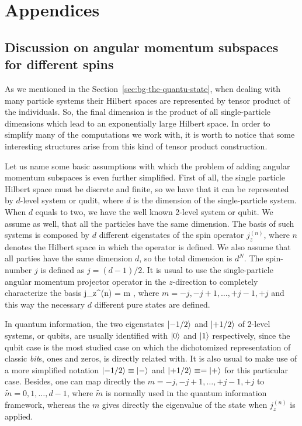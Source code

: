 \renewcommand\thesubsection{\Alph{subsection}}
\section*{Appendices}

\subsection{Discussion on angular momentum subspaces for different spins}
\label{app:angular-subspaces}

As we mentioned in the Section~\ref{sec:bg-the-quantu-state}, when dealing with many particle systems their Hilbert spaces are represented by tensor product of the individuals.
So, the final dimension is the product of all single-particle dimensions which lead to an exponentially large Hilbert space.
In order to simplify many of the computations we work with, it is worth to notice that some interesting structures arise from this kind of tensor product construction.

Let us name some basic assumptions with which the problem of adding angular momentum subspaces is even further simplified.
First of all, the single particle Hilbert space must be discrete and finite, so we have that it can be represented by $d$-level system or qudit, where $d$ is the dimension of the single-particle system.
When $d$ equals to two, we have the well known 2-level system or qubit.
We assume as well, that all the particles have the same dimension.
The basis of such systems is composed by $d$ different eigenstates of the spin operator $j_z^{(n)}$, where $n$ denotes the Hilbert space in which the operator is defined.
We also assume that all parties have the same dimension $d$, so the total dimension is $d^N$.
The spin-number $j$ is defined as $j=(d-1)/2$.
It is usual to use the single-particle angular momentum projector operator in the $z$-direction to completely characterize the basis
\be
  j_z^{(n)} = m ,
\ee
where $m = -j,-j+1,\dots,+j-1,+j$ and this way the necessary $d$ different pure states are defined.

In quantum information, the two eigenstates $\vert{-1/2}\rangle$ and $\vert{+1/2}\rangle$ of 2-level systems, or qubits, are usually identified with $\vert{0}\rangle$ and $\vert{1}\rangle$ respectively, since the qubit case is the most studied case on which the dichotomized representation of classic \emph{bit}s, ones and zeros, is directly related with.
It is also usual to make use of a more simplified notation $\vert{-1/2}\rangle \equiv \vert{-}\rangle$ and $\vert{+1/2}\rangle\equiv=\vert{+}\rangle$ for this particular case.
Besides, one can map directly the $m=-j,-j+1,\dots,+j-1,+j$ to $\tilde{m}=0,1,\dots,d-1$, where $\tilde{m}$ is normally used in the quantum information framework, whereas the $m$ gives directly the eigenvalue of the state when $j_z^{(n)}$ is applied.

